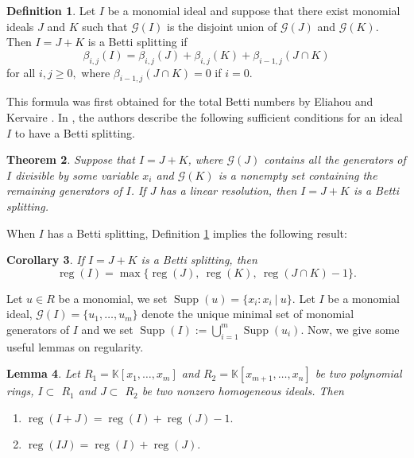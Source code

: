 \documentclass[11pt,reqno]{amsart}
\newcommand{\Supp}{\operatorname{Supp}} \newcommand{\Spec}{\operatorname{Spec}}
\newcommand{\reg}{\operatorname{reg}}
\newtheorem{theorem}{Theorem}[section]
\newtheorem{corollary}[theorem]{Corollary}
\newtheorem{lemma}[theorem]{Lemma}
\theoremstyle{definition}
\newtheorem{definition}[theorem]{Definition}
\begin{document}
\begin{definition}\label{2.1}  
	Let $I$ be a monomial ideal and suppose that there exist monomial ideals $J$ and $K$ such that $\mathcal{G}(I)$ is the disjoint union of $\mathcal{G}(J)$   and $\mathcal{G}(K)$. Then
	$I = J + K$ is a Betti splitting if
	\begin{equation*}
		{\beta_{i,j}}(I) =  {\beta_{i,j}}(J) +
		{\beta_{i,j}}(K) +  {\beta_{i-1,j}}(J\cap K)
	\end{equation*}
	for all $i, j  \geq  0,$ 	where $ {\beta_{i-1,j}}(J\cap K) = 0 $ if $ i = 0.$
\end{definition}
This formula was first obtained for the total Betti numbers by Eliahou and Kervaire \cite{elia}. In \cite{francisco}, the authors describe the following sufficient conditions for an ideal $I$ to have a Betti splitting.
\begin{theorem}\cite[Corollary 2.7]{francisco} \label{betti.1}	Suppose that $I = J + K$, where $\mathcal{G}(J)$ contains
	all the generators of $I$ divisible by some variable $x_i$ and $\mathcal{G}(K)$ is a nonempty set
	containing the remaining generators of $I$. If $J$ has a linear resolution, then $I = J+K$
	is a Betti splitting.
\end{theorem}
When $I$ has a Betti splitting, Definition \ref{2.1} implies the following result:
\begin{corollary}\label{betti.2}
	If $I = J + K$ is a Betti splitting, then
	$$ \reg (I)  = \max \{ \reg (J),~ \reg (K),~ \reg (J  \cap  K)  -  1 \} .$$
\end{corollary}


Let $u \in R$ be a monomial, we set $\Supp(u) = \{x_i : x_i  ~|~ u \}.$ Let $I$ be a monomial ideal,
$\mathcal{G}(I) = \{u_1,\ldots, u_m\}$ denote the unique minimal set of monomial generators of $I$ and we set $\Supp(I) :=  \displaystyle{\bigcup_{i=1}^m}
\Supp(u_i).$ Now, we give some useful lemmas on regularity.      

\begin{lemma}\cite[Lemma 3.2]{ht10}\label{reg.2}
	Let $R_1 = \mathbb{K}[x_1,\ldots , x_m]$ and $R_2 = \mathbb{K}[x_{m+1}, \ldots, x_n]$ be
	two polynomial rings,  $ I \subset $ $R_1$ and  $ J \subset $ $R_2$ be two nonzero homogeneous ideals. Then
	\begin{enumerate}
		\item $ \reg (I + J) = \reg (I) + \reg (J) - 1.$
        \item $ \reg (IJ) = \reg (I) + \reg (J).$
	\end{enumerate}
\end{lemma}
\end{document}
